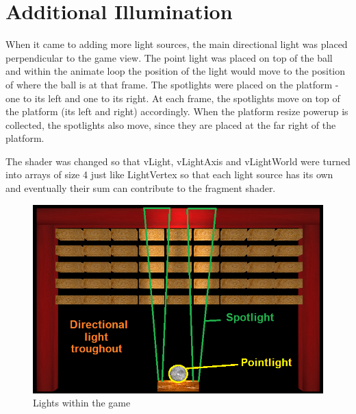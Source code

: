 \chapter{Additional Illumination}

When it came to adding more light sources, the main directional light was placed perpendicular to the game view. The point light was placed on top of the ball and within the animate loop the position of the light would move to the position of where the ball is at that frame. The spotlights were placed on the platform - one to its left and one to its right. At each frame, the spotlights move on top of the platform (its left and right) accordingly. When the platform resize powerup is collected, the spotlights also move, since they are placed at the far right of the platform.

The shader was changed so that vLight, vLightAxis and vLightWorld were turned into arrays of size 4 just like LightVertex so that each light source has its own and eventually their sum can contribute to the fragment shader.

\begin{figure}[H]
	\centering
	\includegraphics[width=\textwidth]{Images/Lights.png}
	\caption{Lights within the game}
\end{figure}